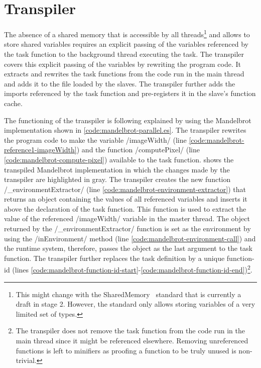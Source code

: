 \section{Transpiler}\label{sec:transpiler}
The absence of a shared memory that is accessible by all threads\footnote{This might change with the SharedMemory~\cite{Ecma2016} standard that is currently a draft in stage 2. However, the standard only allows storing variables of a very limited set of types.} and allows to store shared variables requires an explicit passing of the variables referenced by the task function to the background thread executing the task. The transpiler covers this explicit passing of the variables by rewriting the program code. It extracts and rewrites the task functions from the code run in the main thread and adds it to the file loaded by the slaves. The transpiler further adds the imports referenced by the task function and pre-registers it in the slave's function cache. 

The functioning of the transpiler is following explained by using the Mandelbrot implementation shown in \cref{code:mandelbrot-parallel.es}. The transpiler rewrites the program code to make the variable \javascriptinline/imageWidth/ (line \ref{code:mandelbrot-reference1-imageWidth}) and the function \javascriptinline/computePixel/ (line \ref{code:mandelbrot-compute-pixel}) available to the task function.  shows the transpiled Mandelbrot implementation in which the changes made by the transpiler are highlighted in gray. The transpiler creates the new function \javascriptinline/_environmentExtractor/ (line \ref{code:mandelbrot-environment-extractor}) that returns an object containing the values of all referenced variables and inserts it above the declaration of the task function. This function is used to extract the value of the referenced \javascriptinline/imageWidth/ variable in the master thread. The object returned by the \javascriptinline/_environmentExtractor/ function is set as the environment by using the \javascriptinline/inEnvironment/ method (line \ref{code:mandelbrot-environment-call}) and the runtime system, therefore,  passes the object as the last argument to the task function. The transpiler further replaces the task definition by a unique function-id (lines \ref{code:mandelbrot-function-id-start}-\ref{code:mandelbrot-function-id-end})\footnote{The transpiler does not remove the task function from the code run in the main thread since it might be referenced elsewhere. Removing unreferenced functions is left to minifiers as proofing a function to be truly unused is non-trivial.}. 

